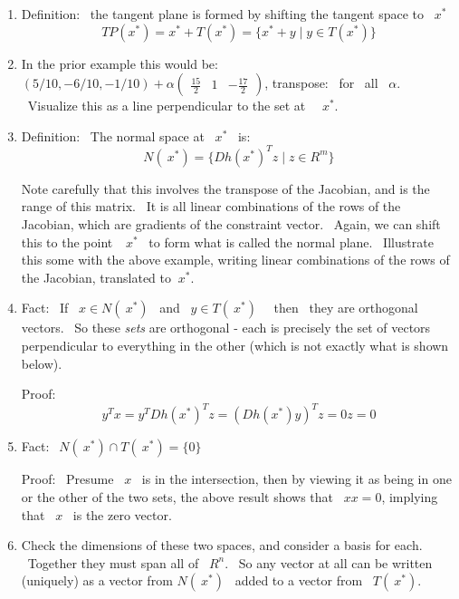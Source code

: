 \documentclass[12pt,thmsa]{article}
\begin{document}
\begin{enumerate}
Check the tangent space:$\left(
\begin{array}{lll}
1 & \frac{-24}{10} & \frac{6}{10} \\
1 & 1 & 1
\end{array}
\right) \bigskip $, nullspace basis: $\left\{ \left(
\begin{array}{c}
\frac{15}{2} \\
1 \\
-\frac{17}{2}
\end{array}
\right) \right\} $

\item  Definition: \ the tangent plane is formed by shifting the tangent
space to \ $x^{\ast }$
\[
TP(x^{\ast })=x^{\ast }+T(x^{\ast })=\{x^{\ast }+y\mid y\in T(x^{\ast })\}
\]
\bigskip

\item  In the prior example this would be:$(5/10,-6/10,-1/10)+\alpha \left(
\begin{array}{ccc}
\frac{15}{2} & 1 & -\frac{17}{2}
\end{array}
\right) $, transpose:  \ for \ all \ $\alpha $. \ Visualize this as a line
perpendicular to the set at \ \ $x^{\ast }$.\bigskip

\item  Definition: \ The normal space at \ $x^{\ast }$ \ is:
\[
N(\ x^{\ast })=\{Dh(x^{\ast })^{T}z\mid z\in R^{m}\}
\]

Note carefully that this involves the transpose of the Jacobian, and is the
range of this matrix. \ It is all linear combinations of the rows of the
Jacobian, which are gradients of the constraint vector. \ Again, we can
shift this to the point \ $\ x^{\ast }$ \ to form what is called the normal
plane. \ Illustrate this some with the above example, writing linear
combinations of the rows of the Jacobian, translated to $\ x^{\ast }$.

\item  Fact: \ If \ $x\in N(\ x^{\ast })$ \ and \ $y\in T(\ x^{\ast })$ \ \
then \ they are orthogonal vectors. \ So these \emph{sets} are orthogonal -
each is precisely the set of vectors perpendicular to everything in the
other (which is not exactly what is shown below).

Proof:
\[
y^{T}x=y^{T}Dh(x^{\ast })^{T}z=(Dh(x^{\ast })y)^{T}z=0z=0
\]

\item  Fact: $\ \ N(\ x^{\ast })\cap T(\ x^{\ast })=\{0\}$

Proof: \ Presume \ $x$ \ is in the intersection, then by viewing it as being
in one or the other of the two sets, the above result shows that \ $xx=0$,
implying that \ $x$ \ is the zero vector.\bigskip

\item  Check the dimensions of these two spaces, and consider a basis for
each. \ Together they must span all of \ $R^{n}$. \ So any vector at all can
be written (uniquely) as a vector from $N(\ x^{\ast })$ \ added to a vector
from \ $T(\ x^{\ast })$.
\end{enumerate}
\end{document}

